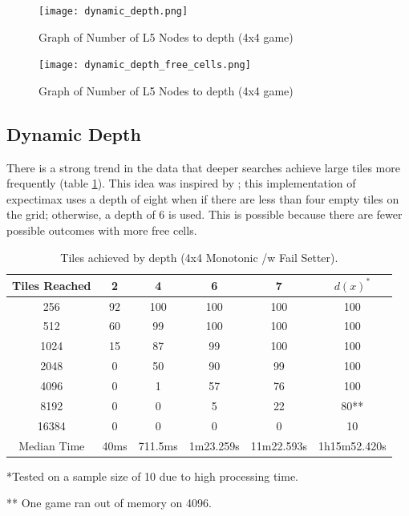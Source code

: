 \documentclass{article}
\begin{document}
\begin{landscape}
\begin{figure}
    \centering
    \texttt{[image: dynamic\_depth.png]}
    \caption{Graph of Number of L5 Nodes to depth (4x4 game)}
    \label{fig:dynamic_depth_graph}
\end{figure}
    \begin{figure}
    \centering
    \texttt{[image: dynamic\_depth\_free\_cells.png]}
    \caption{Graph of Number of L5 Nodes to depth (4x4 game)}
    \label{fig:dynamic_depth_free_graph}
\end{figure}
\end{landscape}

\subsection{Dynamic Depth}
\label{subsec:dyndep}
There is a strong trend in the data that deeper searches achieve large tiles more frequently (table \ref{tab:depth}). This idea was inspired by \cite{expectimax2048}; this implementation of expectimax uses a depth of eight when if there are less than four empty tiles on the grid; otherwise, a depth of 6 is used. This is possible because there are fewer possible outcomes with more free cells.

\begin{table}
    \centering
    \begin{tabular}{|c| c c  cc | c |}
\hline
Tiles Reached&2&4&6&7&$d(x)^*$\\
\hline
256&92&100&100&100&100\\
512&60&99&100&100&100\\
1024&15&87&99&100&100\\
2048&0&50&90&99&100\\
4096&0&1&57&76&100\\
8192&0&0&5&22&80\textsc{**}\\
16384&0&0&0&0&10\\
\hline
Median Time & 40ms & 711.5ms & 1m23.259s & 11m22.593s & 1h15m52.420s\\
\hline
    \end{tabular}
    \caption{Tiles achieved by depth (4x4 Monotonic /w Fail Setter).  }
    \label{tab:depth}
    \par{\textsc{*}Tested on a sample size of 10 due to high processing time.}
    \par{\textsc{**} One game ran out of memory on 4096.}
\end{table}
\end{document}
